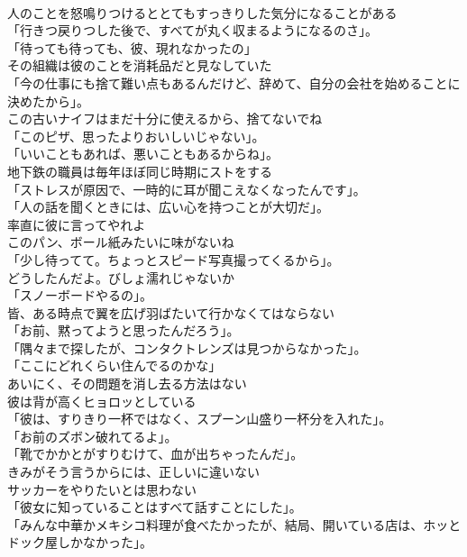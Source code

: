 \documentclass[8pt]{extreport}
\begin{document}
\begin{CJK}{UTF8}{min}
\\	人のことを怒鳴りつけるととてもすっきりした気分になることがある	
\\	「行きつ戻りつした後で、すべてが丸く収まるようになるのさ」。	
\\	「待っても待っても、彼、現れなかったの」	
\\	その組織は彼のことを消耗品だと見なしていた	
\\	「今の仕事にも捨て難い点もあるんだけど、辞めて、自分の会社を始めることに決めたから」。	
\\	この古いナイフはまだ十分に使えるから、捨てないでね	
\\	「このピザ、思ったよりおいしいじゃない」。	
\\	「いいこともあれば、悪いこともあるからね」。	
\\	地下鉄の職員は毎年ほぼ同じ時期にストをする	
\\	「ストレスが原因で、一時的に耳が聞こえなくなったんです」。	
\\	「人の話を聞くときには、広い心を持つことが大切だ」。	
\\	率直に彼に言ってやれよ	
\\	このパン、ボール紙みたいに味がないね	
\\	「少し待ってて。ちょっとスピード写真撮ってくるから」。	
\\	どうしたんだよ。びしょ濡れじゃないか	
\\	「スノーボードやるの」。	
\\	皆、ある時点で翼を広げ羽ばたいて行かなくてはならない	
\\	「お前、黙ってようと思ったんだろう」。	
\\	「隅々まで探したが、コンタクトレンズは見つからなかった」。	
\\	「ここにどれくらい住んでるのかな」	
\\	あいにく、その問題を消し去る方法はない	
\\	彼は背が高くヒョロッとしている	
\\	「彼は、すりきり一杯ではなく、スプーン山盛り一杯分を入れた」。	
\\	「お前のズボン破れてるよ」。	
\\	「靴でかかとがすりむけて、血が出ちゃったんだ」。	
\\	きみがそう言うからには、正しいに違いない	
\\	サッカーをやりたいとは思わない	
\\	「彼女に知っていることはすべて話すことにした」。	
\\	「みんな中華かメキシコ料理が食べたかったが、結局、開いている店は、ホッとドック屋しかなかった」。	

\end{CJK}
\end{document}
